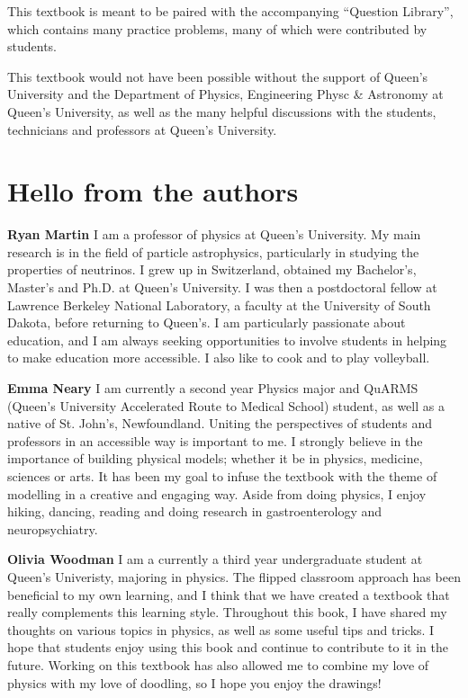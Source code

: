 This textbook is meant to be paired with the accompanying ``Question Library'', which contains many practice problems, many of which were contributed by students. 

This textbook would not have been possible without the support of Queen's University and the Department of Physics, Engineering Physc \& Astronomy at Queen's University, as well as the many helpful discussions with the students, technicians and professors at Queen's University.

\section*{Hello from the authors}
\textbf{Ryan Martin} I am a professor of physics at Queen's University. My main research is in the field of particle astrophysics, particularly in studying the properties of neutrinos. I grew up in Switzerland, obtained my Bachelor's, Master's and Ph.D. at Queen's University. I was then a postdoctoral fellow at Lawrence Berkeley National Laboratory, a faculty at the University of South Dakota, before returning to Queen's. I am particularly passionate about education, and I am always seeking opportunities to involve students in helping to make education more accessible. I also like to cook and to play volleyball.

\textbf{Emma Neary} I am currently a second year Physics major and QuARMS (Queen's University Accelerated Route to Medical School) student, as well as a native of St. John's, Newfoundland. Uniting the perspectives of students and professors in an accessible way is important to me. I strongly believe in the importance of building physical models; whether it be in physics, medicine, sciences or arts. It has been my goal to infuse the textbook with the theme of modelling in a creative and engaging way. Aside from doing physics, I enjoy hiking, dancing, reading and doing research in gastroenterology and neuropsychiatry.  

\textbf{Olivia Woodman} I am a currently a third year undergraduate student at Queen's Univeristy, majoring in physics. The flipped classroom approach has been beneficial to my own learning, and I think that we have created a textbook that really complements this learning style. Throughout this book, I have shared my thoughts on various topics in physics, as well as some useful tips and tricks. I hope that students enjoy using this book and continue to contribute to it in the future. Working on this textbook has also allowed me to combine my love of physics with my love of doodling, so I hope you enjoy the drawings!

